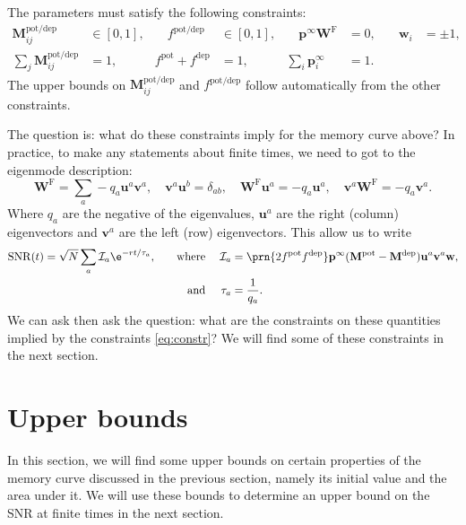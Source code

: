 \documentclass{article} %
\DeclareMathOperator{\snr}{SNR}
\newcommand{\pr}{\mathbf{p}}
\newcommand{\eq}{\pr^\infty}
\newcommand{\w}{\mathbf{w}}
\newcommand{\W}{\mathbf{W}}
\newcommand{\M}{\mathbf{M}}
\newcommand{\frg}{\W^{\mathrm{F}}}
\newcommand{\pot}{^{\text{pot}}}
\newcommand{\dep}{^{\text{dep}}}
\newcommand{\potdep}{^{\text{pot/dep}}}
\newcommand{\uv}{\mathbf{u}}
\newcommand{\vv}{\mathbf{v}}
\newcommand{\CI}{\mathcal{I}}
\begin{document}
The parameters must satisfy the following constraints:
%
\begin{equation}\label{eq:constr}
\begin{aligned}
  \M\potdep_{ij} &\in [0,1], &\quad
  f\potdep &\in [0,1], &\quad
  \eq\frg &= 0, &\quad
  \w_i &= \pm 1, \\
  \sum_j \M\potdep_{ij} &= 1, &
  f\pot + f\dep &= 1, &
  \sum_i \eq_i &= 1.
\end{aligned}
\end{equation}
%
The upper bounds on $\M\potdep_{ij}$ and $f\potdep$ follow automatically from the other constraints.

The question is: what do these constraints imply for the memory curve above?
In practice, to make any statements about finite times, we need to got to the eigenmode description:
%
\begin{equation}\label{eq:eigendecomp}
  \frg = \sum_a -q_a \uv^a \vv^a,
  \quad
  \vv^a \uv^b = \delta_{ab},
  \quad
  \frg \uv^a = -q_a \uv^a,
  \quad
  \vv^a \frg = -q_a \vv^a.
\end{equation}
%
Where $q_a$ are the negative of the eigenvalues, $\uv^a$ are the right (column) eigenvectors and $\vv^a$ are the left (row) eigenvectors.
This allow us to write
%
\begin{equation}\label{eq:SNReigen}
\begin{aligned}
  \snr(t) &= \sqrt{N}\sum_a \CI_a \e^{-rt/\tau_a},
  &\quad \text{where}&\;&
  \CI_a &= \prn{2 f\pot f\dep} \eq (\M\pot-\M\dep) \uv^a  \vv^a \w,\\&
  & \text{and}&&
  \tau_a &= \frac{1}{q_a}.
\end{aligned}
\end{equation}
%
We can ask then ask the question: what are the constraints on these quantities implied by the constraints \eqref{eq:constr}?
We will find some of these constraints in the next section.





\section{Upper bounds}\label{sec:bounds}

In this section, we will find some upper bounds on certain properties of the memory curve discussed in the previous section, namely its initial value and the area under it.
We will use these bounds to determine an upper bound on the SNR at finite times in the next section.
\end{document}
